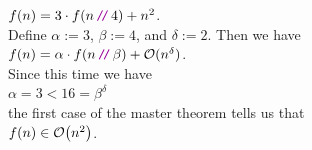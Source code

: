 \begin{enumerate}
      \hspace*{1.3cm}
      $f(n) = 3 \cdot f(n \dv 4) + n^2$.
      \\[0.2cm]
      Define $\alpha := 3$, $\beta := 4$, and $\delta := 2$.  Then we have
      \\[0.2cm]
      \hspace*{1.3cm}
      $f(n) = \alpha \cdot f(n \dv \beta) + \Oh(n^\delta)$.
      \\[0.2cm]
      Since this time we have
      \\[0.2cm]
      \hspace*{1.3cm}
      $\alpha = 3 < 16 = \beta^\delta$
      \\[0.2cm]
      the first case of the master theorem tells us that
      \\[0.2cm]
      \hspace*{1.3cm}
      $f(n) \in \mathcal{O}\bigl(n^2\bigr)$.
\end{enumerate}

